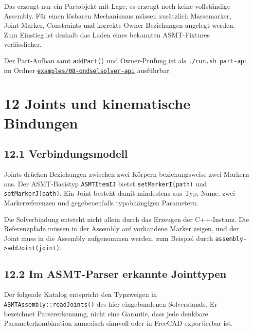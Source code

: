 \documentclass[
  12pt
]{book}
\begin{document}
Das erzeugt nur ein Partobjekt mit Lage; es erzeugt noch keine
vollständige Assembly. Für einen lösbaren Mechanismus müssen zusätzlich
Massemarker, Joint-Marker, Constraints und korrekte Owner-Beziehungen
angelegt werden. Zum Einstieg ist deshalb das Laden eines bekannten
ASMT-Fixtures verlässlicher.

Der Part-Aufbau samt \texttt{addPart()} und Owner-Prüfung ist als
\texttt{./run.sh\ part-api} im Ordner
\href{./examples/08-ondselsolver-api/README.md}{\texttt{examples/08-ondselsolver-api}}
ausführbar.

\hypertarget{kap-joints}{%
\chapter{\texorpdfstring{{12} Joints und kinematische
Bindungen}{12 Joints und kinematische Bindungen}}\label{kap-joints}}

\hypertarget{verbindungsmodell}{%
\section{\texorpdfstring{{12.1}
Verbindungsmodell}{12.1 Verbindungsmodell}}\label{verbindungsmodell}}

Joints drücken Beziehungen zwischen zwei Körpern beziehungsweise zwei
Markern aus. Der ASMT-Basistyp \texttt{ASMTItemIJ} bietet
\texttt{setMarkerI(path)} und \texttt{setMarkerJ(path)}. Ein Joint
besteht damit mindestens aus Typ, Name, zwei Markerreferenzen und
gegebenenfalls typabhängigen Parametern.

Die Solverbindung entsteht nicht allein durch das Erzeugen der
C++-Instanz. Die Referenzpfade müssen in der Assembly auf vorhandene
Marker zeigen, und der Joint muss in die Assembly aufgenommen werden,
zum Beispiel durch \texttt{assembly-\textgreater{}addJoint(joint)}.

\hypertarget{im-asmt-parser-erkannte-jointtypen}{%
\section{\texorpdfstring{{12.2} Im ASMT-Parser erkannte
Jointtypen}{12.2 Im ASMT-Parser erkannte Jointtypen}}\label{im-asmt-parser-erkannte-jointtypen}}

Der folgende Katalog entspricht den Typzweigen in
\texttt{ASMTAssembly::readJoints()} des hier eingebundenen Solverstands.
Er bezeichnet Parsererkennung, nicht eine Garantie, dass jede denkbare
Parameterkombination numerisch sinnvoll oder in FreeCAD exportierbar
ist.
\end{document}
